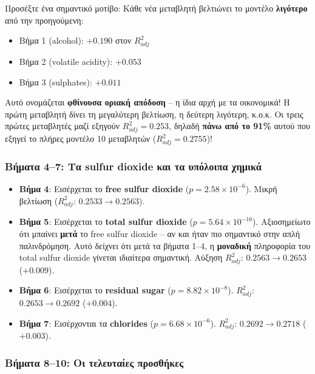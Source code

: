 \documentclass[12pt,a4paper]{article}
\begin{document}
\begin{importantbox}
Προσέξτε ένα σημαντικό μοτίβο: Κάθε νέα μεταβλητή βελτιώνει το μοντέλο \textbf{λιγότερο} από την προηγούμενη:
\begin{itemize}
    \item Βήμα 1 (alcohol): $+0.190$ στον $R^2_{adj}$
    \item Βήμα 2 (volatile acidity): $+0.053$
    \item Βήμα 3 (sulphates): $+0.011$
\end{itemize}
Αυτό ονομάζεται \textbf{φθίνουσα οριακή απόδοση} -- η ίδια αρχή με τα οικονομικά! Η πρώτη μεταβλητή δίνει τη μεγαλύτερη βελτίωση, η δεύτερη λιγότερη, κ.ο.κ. Οι τρεις πρώτες μεταβλητές μαζί εξηγούν $R^2_{adj} = 0.253$, δηλαδή \textbf{πάνω από το 91\%} αυτού που εξηγεί το πλήρες μοντέλο 10 μεταβλητών ($R^2_{adj} = 0.2755$)!
\end{importantbox}

\subsubsection{Βήματα 4--7: Τα sulfur dioxide και τα υπόλοιπα χημικά}

\begin{itemize}
    \item \textbf{Βήμα 4}: Εισέρχεται το \textbf{free sulfur dioxide} ($p = 2.58 \times 10^{-6}$). Μικρή βελτίωση ($R^2_{adj}$: $0.2533 \to 0.2563$).

    \item \textbf{Βήμα 5}: Εισέρχεται το \textbf{total sulfur dioxide} ($p = 5.64 \times 10^{-16}$). Αξιοσημείωτο ότι μπαίνει \textbf{μετά} το free sulfur dioxide -- αν και ήταν πιο σημαντικό στην απλή παλινδρόμηση. Αυτό δείχνει ότι μετά τα βήματα 1--4, η \textbf{μοναδική} πληροφορία του total sulfur dioxide γίνεται ιδιαίτερα σημαντική. Αύξηση $R^2_{adj}$: $0.2563 \to 0.2653$ ($+0.009$).

    \item \textbf{Βήμα 6}: Εισέρχεται το \textbf{residual sugar} ($p = 8.82 \times 10^{-8}$). $R^2_{adj}$: $0.2653 \to 0.2692$ ($+0.004$).

    \item \textbf{Βήμα 7}: Εισέρχονται τα \textbf{chlorides} ($p = 6.68 \times 10^{-6}$). $R^2_{adj}$: $0.2692 \to 0.2718$ ($+0.003$).
\end{itemize}

\subsubsection{Βήματα 8--10: Οι τελευταίες προσθήκες}
\end{document}
